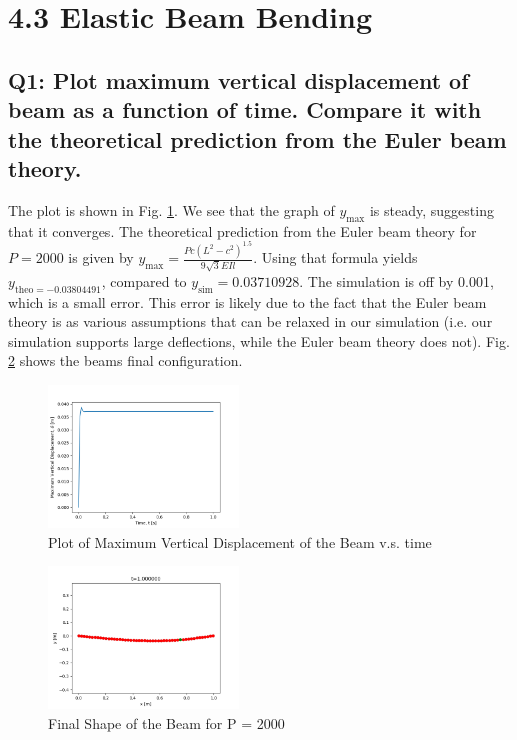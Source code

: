 \documentclass[letterpaper, 10 pt, conference]{ieeeconf}  %
\begin{document}
\section{4.3 Elastic Beam Bending}

\subsection*{Q1: Plot maximum vertical displacement of beam as a function of time. Compare it with the theoretical prediction from the Euler beam theory.}

The plot is shown in Fig. \ref{"fig:p3q1_max_vert"}. We see that the graph of  $y_{\text{max}}$ is steady, suggesting that it converges. The theoretical prediction from the Euler beam theory for $P = 2000$ is given by $y_{\text{max}} = \frac{Pc(L^2-c^2)^1.5}{9\sqrt{3} E I l}$. Using that formula yields $y_{\text{theo} = -0.03804491}$, compared to $y_\text{sim}=0.03710928$. The simulation is off by 0.001, which is a small error. This error is likely due to the fact that the Euler beam theory is as various assumptions that can be relaxed in our simulation (i.e. our simulation supports large deflections, while the Euler beam theory does not). Fig. \ref{"fig:p3q1_beam2000"} shows the beams final configuration.

\begin{figure}[!ht]
        \centering
        \includegraphics[width=0.45\textwidth,keepaspectratio]{p3q1_implicit_fallingBeam.png}
        \caption{Plot of Maximum Vertical Displacement of the Beam v.s. time}
        \label{"fig:p3q1_max_vert"}
\end{figure}

\begin{figure}[!ht]
        \centering
        \includegraphics[width=0.45\textwidth,keepaspectratio]{p3q1_implicit_2000.png}
        \caption{Final Shape of the Beam for P = 2000}
        \label{"fig:p3q1_beam2000"}
\end{figure}
\end{document}
